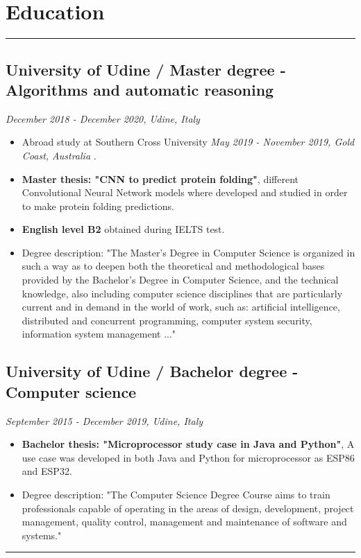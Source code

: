 \documentclass[a4paper,10pt]{article}
\begin{document}
\begin{minipage}[t]{0.25\textwidth}
        \section*{Education}
    \vspace{11.8cm} %
    \rule{0.6cm}{0.3mm}
\end{minipage}
\hfill
\begin{minipage}[t]{0.75\textwidth}
     \subsection*{University of Udine / Master degree - Algorithms and automatic reasoning }
    \textit{December 2018 - December 2020, Udine, Italy} \\
    \begin{itemize}[leftmargin=1cm]
        \item Abroad study at Southern Cross University \textit{May 2019 - November 2019, Gold Coast, Australia} .
        \item \textbf{Master thesis: "CNN to predict protein folding"}, different Convolutional Neural Network models where developed and studied in order to make protein folding predictions.
        \item \textbf{English level B2} obtained during IELTS test. 
         \item Degree description: "The Master's Degree in Computer Science is organized in such a way as to deepen both the theoretical and methodological bases provided by the Bachelor's Degree in Computer Science, and the technical knowledge, also including computer science disciplines that are particularly current and in demand in the world of work, such as: artificial intelligence, distributed and concurrent programming, computer system security, information system management ..."
    \end{itemize}

    \subsection*{University of Udine / Bachelor degree - Computer science }
    \textit{September 2015 - December 2019, Udine, Italy} \\
        \begin{itemize}[leftmargin=1cm]
        \item \textbf{Bachelor thesis:   "Microprocessor study case in Java and Python"}, A use case was developed in both Java and Python for microprocessor as ESP86 and ESP32.
        \item Degree description: "The Computer Science Degree Course aims to train professionals capable of operating in the areas of design, development, project management, quality control, management and maintenance of software and systems."
    \end{itemize}
    \rule{\linewidth}{0.5mm}
\end{minipage}
\end{document}
